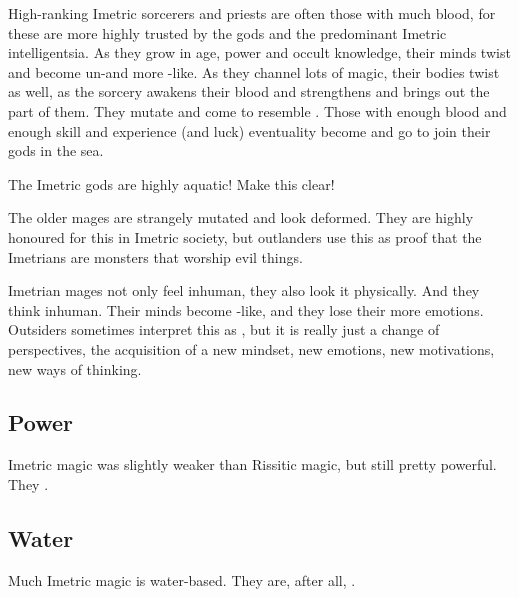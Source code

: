 High-ranking Imetric sorcerers and priests are often those with much \naga blood, for these are more highly trusted by the gods and the predominant Imetric intelligentsia.
As they grow in age, power and occult  knowledge, their minds twist and become un-\scathaese and more \naga-like. 
As they channel lots of magic, their bodies twist as well, as the \naga sorcery awakens their \naga blood and strengthens and brings out the \naga part of them. 
They mutate and come to resemble \nagae.
Those with enough \naga blood and enough skill and experience (and luck) eventuality become \nagae and go to join their gods in the sea.

The Imetric gods are highly aquatic! 
Make this clear!

The older mages are strangely mutated and look deformed.
They are highly honoured for this in Imetric society, but outlanders use this as proof that the Imetrians are monsters that worship evil things.

Imetrian mages not only feel inhuman, they also look it physically.
And they think inhuman. 
Their minds become \naga-like, and they lose their more \scathaese emotions.
Outsiders sometimes interpret this as , but it is really just a change of perspectives, the acquisition of a new mindset, new emotions, new motivations, new ways of thinking.





\subsection{Power}
Imetric magic was slightly weaker than Rissitic magic, but still pretty powerful. 
They . 





\subsection{Water}
Much Imetric magic is water-based. 
They are, after all, . 















